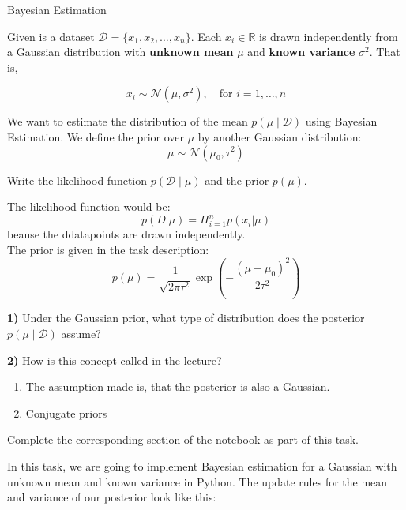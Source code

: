 \documentclass[
	english,
        solution=true
	]{tudaexercise}
\begin{document}
\begin{task}[points=16]{Bayesian Estimation}

Given is a dataset \( \mathcal{D} = \{x_1, x_2, \dots, x_n\} \). Each \( x_i \in \mathbb{R} \) is drawn independently from a Gaussian distribution with \textbf{unknown mean} \( \mu \) and \textbf{known variance} \( \sigma^2 \). That is,

\[
x_i \sim \mathcal{N}(\mu, \sigma^2), \quad \text{for } i = 1, \dots, n
\]

We want to estimate the distribution of the mean $ p(\mu \mid \mathcal{D}) $ using Bayesian Estimation. We define the prior over $\mu$ by another Gaussian distribution:
\[
\mu \sim \mathcal{N}(\mu_0, \tau^2)
\]
\begin{subtask}[points=2]{}
    Write the likelihood function $p(\mathcal{D} \mid \mu)$ and the prior $p(\mu)$.
\end{subtask}

\begin{solution}

The likelihood function would be:
\[p(D|\mu)=\Pi^n_{i=1} p(x_i|\mu)\]
beause the ddatapoints are drawn independently. \\
The prior is given in the task description:
\[p(\mu)=\frac{1}{\sqrt{2\pi\tau^2}}\exp (-\frac{(\mu-\mu_0)^2}{2\tau^2})\]

\end{solution}

\begin{subtask}[points=2]


\textbf{1)} Under the Gaussian prior, what type of distribution does the posterior $ p(\mu \mid \mathcal{D})$ assume? 

\textbf{2)} How is this concept called in the lecture?
\end{subtask}

\begin{solution}

\begin{enumerate}
    \item The assumption made is, that the posterior is also a Gaussian.
    \item Conjugate priors
\end{enumerate}

\end{solution}

\begin{subtask}[points=12]

\begin{programmingtaskbox}
Complete the corresponding section of the notebook as part of this task.
\end{programmingtaskbox}
    In this task, we are going to implement Bayesian estimation for a Gaussian with unknown mean and known variance in Python. The update rules for the mean and variance of our posterior look like this:


\end{subtask}
\end{task}
\end{document}
